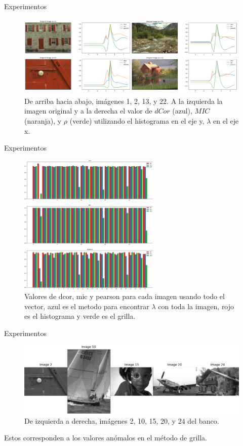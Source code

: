 \documentclass{beamer}
\begin{document}
\begin{frame}{Experimentos}
    \begin{figure}[H]
        \centering
        \includegraphics[width=\textwidth]{lam_v_com_all_img_hist.png}
        \caption{De arriba hacia abajo, im\'agenes 1, 2, 13, y 22. A la izquierda la imagen original y a la derecha el valor de $dCor$ (azul), $MIC$ (naranja), y $\rho$ (verde) utilizando el histograma en el eje y, $\lambda$ en el eje x.}
    \end{figure}
\end{frame}

\begin{frame}{Experimentos}
    \begin{figure}[H]
        \centering
        \includegraphics[width=0.6\textwidth]{plot_comparison_full.png}
        \caption{Valores de dcor, mic y pearson para cada imagen usando todo el vector, azul es el metodo para encontrar $\lambda$ con toda la imagen, rojo es el histograma y verde es el grilla.}
    \end{figure}
\end{frame}


\begin{frame}{Experimentos}
    \begin{figure}[H]
        \centering
        \includegraphics[width=\textwidth]{anomalies_grid.png}
        \caption{De izquierda a derecha, im\'agenes 2, 10, 15, 20, y 24 del banco.}
    \end{figure}
    Estos corresponden a los valores an\'omalos en el m\'etodo de grilla.
\end{frame}
\end{document}
